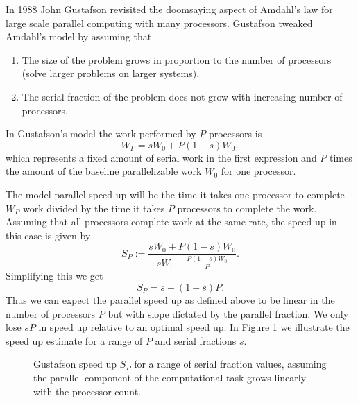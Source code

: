 In 1988 John Gustafson revisited the doomsaying aspect of Amdahl's law \cite{gustafson1988reevaluating} for large scale parallel computing with many processors. Gustafson tweaked Amdahl's model by assuming that 

\begin{enumerate}
    \item The size of the problem grows in proportion to the number of processors (solve larger problems on larger systems).
    \item The serial fraction of the problem does not grow with increasing number of processors.
\end{enumerate}


In Gustafson's model the work performed by $P$ processors is
\[
W_P = sW_0 + P(1-s)W_0,
\]
which represents a fixed amount of serial work in the first expression and $P$ times the amount of the baseline parallelizable work $W_0$ for one processor.

The model parallel speed up will be the time it takes one processor to complete $W_P$ work divided by the time it takes $P$ processors to complete the work. Assuming that all processors complete work at the same rate, the speed up in this case is given by
\[
S_P := \frac{sW_0 + P(1-s)W_0}{sW_0 + \frac{P(1-s)W_0}{P}}.
\]
Simplifying this we get 
\[
S_P = s + (1-s)P.
\]
Thus we can expect the parallel speed up as defined above to be linear in the number of processors $P$ but with slope dictated by the parallel fraction. We only lose $sP$ in speed up relative to an optimal speed up. In Figure \ref{gustafson.fig} we illustrate the speed up estimate for a range of $P$ and serial fractions $s$.

\begin{figure}[htbp!]
\begin{center}
\end{center}
\caption{Gustafson speed up $S_P$ for a range of serial fraction values, assuming the parallel component of the computational task grows linearly with the processor count.}
\label{gustafson.fig}
\end{figure}

